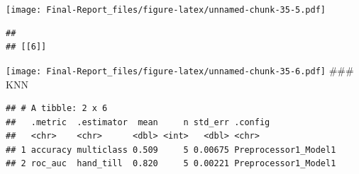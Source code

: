 \documentclass[
]{article}
\newenvironment{Shaded}{\begin{snugshade}}{\end{snugshade}}
\newcommand{\FunctionTok}[1]{\textcolor[rgb]{0.00,0.00,0.00}{#1}}
\newcommand{\NormalTok}[1]{#1}
\newcommand{\OtherTok}[1]{\textcolor[rgb]{0.56,0.35,0.01}{#1}}
\newcommand{\SpecialCharTok}[1]{\textcolor[rgb]{0.00,0.00,0.00}{#1}}
\begin{document}
\texttt{[image: Final-Report\_files/figure-latex/unnamed-chunk-35-5.pdf]}

\begin{verbatim}
## 
## [[6]]
\end{verbatim}

\texttt{[image: Final-Report\_files/figure-latex/unnamed-chunk-35-6.pdf]}
\#\#\# KNN

\begin{Shaded}
\end{Shaded}

\begin{verbatim}
## # A tibble: 2 x 6
##   .metric  .estimator  mean     n std_err .config             
##   <chr>    <chr>      <dbl> <int>   <dbl> <chr>               
## 1 accuracy multiclass 0.509     5 0.00675 Preprocessor1_Model1
## 2 roc_auc  hand_till  0.820     5 0.00221 Preprocessor1_Model1
\end{verbatim}

\begin{Shaded}
\end{Shaded}
\end{document}
